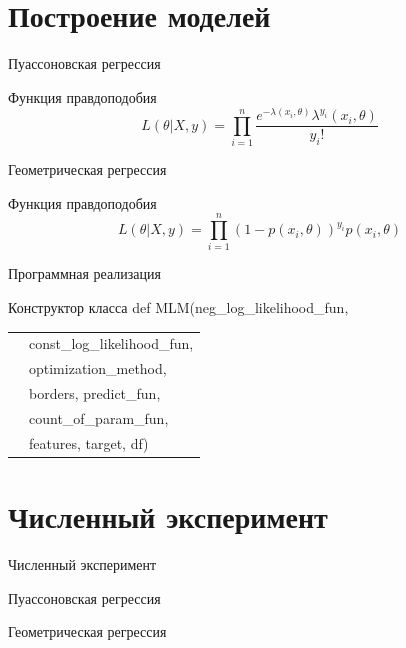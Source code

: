 \documentclass[aspectratio=169]{beamer}
\begin{document}
    \section{Построение моделей}
    \begin{frame}{Пуассоновская регрессия}
        \begin{block}{Функция правдоподобия}
            $$L(\theta | X, y) = \prod\limits_{i=1}^{n} \dfrac{e^{-\lambda(x_i, \theta)} \lambda^{y_i}(x_i, \theta)}{y_i!}$$
        \end{block}
    \end{frame}


    \begin{frame}{Геометрическая регрессия}
        \begin{block}{Функция правдоподобия}
            $$L(\theta | X, y) = \prod\limits_{i = 1}^n (1-p(x_i,\theta))^{y_i}p(x_i,\theta)$$
        \end{block}        
    \end{frame}


    \begin{frame}{Программная реализация}
        \begin{block}{Конструктор класса}
            \textcolor{myGreen}{def} \textcolor{myBlue}{MLM}(neg\_log\_likelihood\_fun,\\
            \begin{tabular}{p{1cm}l}
                & const\_log\_likelihood\_fun,\\
                & optimization\_method,\\
                & borders, predict\_fun,\\
                & count\_of\_param\_fun,\\
                & features, target, df)
            \end{tabular}
        \end{block}
    \end{frame}

    
    \section{Численный эксперимент}
    \begin{frame}{Численный эксперимент}
        \begin{block}{Пуассоновская регрессия}
            
        \end{block}
    
        \begin{block}{Геометрическая регрессия}
            
        \end{block}
    \end{frame}
\end{document}
